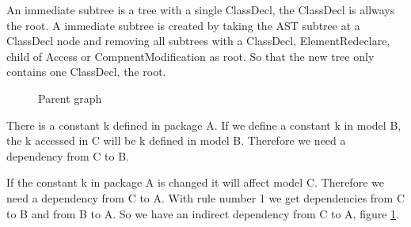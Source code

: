 \documentclass{cslthse-msc}
\begin{document}
An immediate subtree is a tree with a single ClassDecl, the ClassDecl is allways the root.
A immediate subtree is created by taking the AST subtree at a ClassDecl node and removing all subtrees with a ClassDecl, ElementRedeclare, child of Access or CompnentModification as root. So that the new tree only contains one ClassDecl, the root.
\begin{figure}[h]
    \centering
    \qquad
    \subfloat{{}}
    \caption{Parent graph}
    \label{fig:parentGraph}
\end{figure}

There is a constant k defined in package A. If we define a constant k in model B, the k accessed in C will be k defined in model B. Therefore we need a dependency from C to B.

If the constant k in package A is changed it will affect model C. Therefore we need a dependency from C to A. With rule number 1 we get dependencies from C to B and from B to A. So we have an indirect dependency from C to A, figure \ref{fig:parentGraph}.
\end{document}

